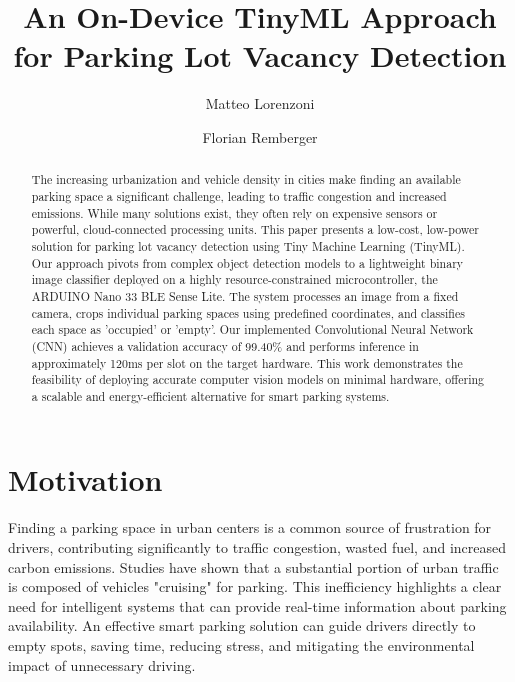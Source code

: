 \documentclass[sigconf,10pt,nonacm]{acmart}
\begin{document}
\title[TinyML Parking Vacancy Detection]{An On-Device TinyML Approach for Parking Lot Vacancy Detection}

\author{Matteo Lorenzoni}

\author{Florian Remberger}


\renewcommand{\shortauthors}{Lorenzoni and Remberger}


\begin{abstract}
The increasing urbanization and vehicle density in cities make finding an available parking space a significant challenge, leading to traffic congestion and increased emissions. While many solutions exist, they often rely on expensive sensors or powerful, cloud-connected processing units. This paper presents a low-cost, low-power solution for parking lot vacancy detection using Tiny Machine Learning (TinyML). Our approach pivots from complex object detection models to a lightweight binary image classifier deployed on a highly resource-constrained microcontroller, the ARDUINO Nano 33 BLE Sense Lite. The system processes an image from a fixed camera, crops individual parking spaces using predefined coordinates, and classifies each space as 'occupied' or 'empty'. Our implemented Convolutional Neural Network (CNN) achieves a validation accuracy of 99.40\% and performs inference in approximately 120ms per slot on the target hardware. This work demonstrates the feasibility of deploying accurate computer vision models on minimal hardware, offering a scalable and energy-efficient alternative for smart parking systems.
\end{abstract}

\maketitle

\section{Motivation}
\label{sec:motivation}
Finding a parking space in urban centers is a common source of frustration for drivers, contributing significantly to traffic congestion, wasted fuel, and increased carbon emissions. Studies have shown that a substantial portion of urban traffic is composed of vehicles "cruising" for parking. This inefficiency highlights a clear need for intelligent systems that can provide real-time information about parking availability. An effective smart parking solution can guide drivers directly to empty spots, saving time, reducing stress, and mitigating the environmental impact of unnecessary driving.
\end{document}
